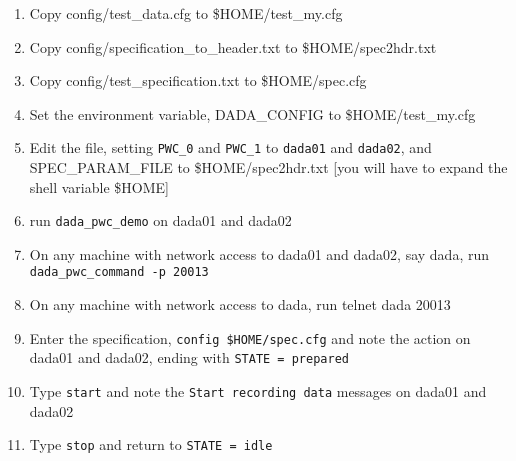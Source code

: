 \begin{enumerate}

\item Copy config/test_data.cfg to \$HOME/test_my.cfg

\item Copy config/specification_to_header.txt to \$HOME/spec2hdr.txt

\item Copy config/test_specification.txt to \$HOME/spec.cfg

\item Set the environment variable, DADA_CONFIG to \$HOME/test_my.cfg

\item Edit the file, setting {\tt PWC\_0} and {\tt PWC\_1} to {\tt dada01}
	and {\tt dada02}, and SPEC_PARAM_FILE to \$HOME/spec2hdr.txt
        [you will have to expand the shell variable \$HOME]

\item run {\tt dada\_pwc\_demo} on dada01 and dada02

\item On any machine with network access to dada01 and dada02, say dada,
      run {\tt dada\_pwc\_command -p 20013}

\item On any machine with network access to dada, run {telnet dada 20013}

\item Enter the specification, {\tt config \$HOME/spec.cfg} and note
      the action on dada01 and dada02, ending with {\tt STATE = prepared}

\item Type {\tt start} and note the {\tt Start recording data} messages
      on dada01 and dada02

\item Type {\tt stop} and return to {\tt STATE = idle}

\end {enumerate}
